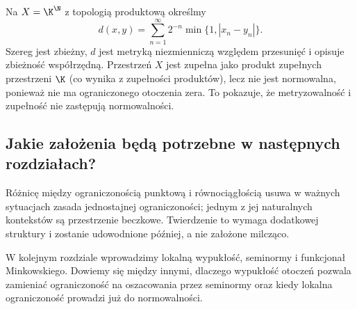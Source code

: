 \begin{przyklad}
\label{ex:metrizable-not-normable}
Na $X=\K^{\N}$ z topologią produktową określmy
\[
 d(x,y)=\sum_{n=1}^{\infty}2^{-n}\min\{1,|x_n-y_n|\}.
\]
Szereg jest zbieżny, $d$ jest metryką niezmienniczą
względem przesunięć i opisuje zbieżność współrzędną.
Przestrzeń $X$ jest zupełna jako produkt zupełnych
przestrzeni $\K$ (co wynika z zupełności produktów),
lecz nie jest normowalna, ponieważ nie ma ograniczonego
otoczenia zera. To pokazuje, że metryzowalność i
zupełność nie zastępują normowalności.
\end{przyklad}

\subsection{Jakie założenia będą potrzebne w następnych rozdziałach?}

Różnicę między ograniczonością punktową i równociągłością
usuwa w ważnych sytuacjach zasada jednostajnej ograniczoności;
jednym z jej naturalnych kontekstów są przestrzenie beczkowe.
Twierdzenie to wymaga dodatkowej struktury i zostanie
udowodnione później, a nie założone milcząco.

W kolejnym rozdziale wprowadzimy lokalną wypukłość,
seminormy i funkcjonał Minkowskiego. Dowiemy się między
innymi, dlaczego wypukłość otoczeń pozwala zamieniać
ograniczoność na oszacowania przez seminormy oraz
kiedy lokalna ograniczoność prowadzi już do normowalności.
